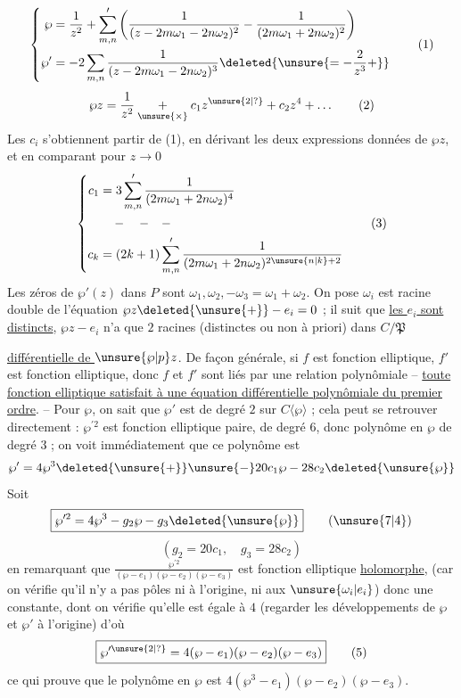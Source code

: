 \noindent {} 

\[
\left\{\begin{aligned}
\wp&=\frac1{z^2}+\sum_{m,n}'\left(\frac1{(z-2m\omega_1-2n\omega_2)^2}-\frac1{(2m\omega_1+2n\omega_2)^2}\right)\\
\wp'&=-2\sum_{m,n}\frac1{(z-2m\omega_1-2n\omega_2)^3}\deleted{\unsure{=-\frac2{z^3}+}}
\end{aligned}\right.\tag*{(1)}
\]
\[
\wp z=\frac1{z^2}\underset{\unsure{\times}}{+}c_1z^{\unsure{2|?}}+c_2z^4+\ldots\tag*{(2)}
\]
Les $c_i$ s'obtiennent  partir de (1), en dérivant les deux expressions données de $\wp z$, et en comparant pour $z\to0$
\[
\left\{\begin{aligned}
c_1&=3\sum_{m,n}'\frac1{(2m\omega_1+2n\omega_2)^4}\\
&\quad -\quad -\quad -\\
c_k&=(2k+1)\sum_{m,n}'\frac1{(2m\omega_1+2n\omega_2)^{2\unsure{n|k}+2}}
\end{aligned}\right.\tag*{(3)}
\]
Les zéros de $\wp'(z)$ dans $P$ sont $\omega_1,\omega_2,-\omega_3=\omega_1+\omega_2$. On pose  $\omega_i$ est racine double de l'équation $\wp z\deleted{\unsure{+}}-e_i=0$ ; il suit que \uline{les $e_i$ sont distincts},  $\wp z-e_i$ n'a que $2$ racines (distinctes ou non à priori) dans $C/\mathfrak P$

\uline{ différentielle de $\unsure{\wp|p}z$}. De façon générale, si $f$ est fonction elliptique, $f'$ est fonction elliptique, donc $f$ et $f'$ sont liés par une relation polynômiale -- \uline{toute fonction elliptique satisfait à une équation différentielle polynômiale du premier ordre}. -- Pour $\wp$, on sait que $\wp'$ est de degré $2$ sur $C\langle\wp\rangle$ ; cela peut se retrouver directement : $\wp^{\prime 2}$ est fonction elliptique paire, de degré $6$, donc polynôme en $\wp$ de degré $3$ ; on voit immédiatement   que ce polynôme est 
\[
\wp'=4\wp^3\deleted{\unsure{+}}\unsure{-}20c_1\wp-28c_2\deleted{\unsure{\wp}}
\]
Soit
\[
\boxed{\wp^{\prime 2}=4\wp^3-g_2\wp-g_3\deleted{\unsure{\wp}}}\tag*{(\unsure{7|4})}
\]
\[
(g_2=20c_1,\quad g_3=28c_2)
\]
 en remarquant que $\frac{\wp^{\prime 2}}{(\wp-e_1)(\wp-e_2)(\wp-e_3)}$ est fonction elliptique \uline{holomorphe}, (car on vérifie qu'il n'y a pas  pôles ni à l'origine, ni aux $\unsure{\omega_i|e_i}$) donc une constante, dont on vérifie qu'elle est égale à $4$ (regarder les développements de $\wp$ et $\wp'$ à l'origine) d'où
\[
\boxed{\wp^{\prime \unsure{2|?}}=4(\wp-e_1)(\wp-e_2)(\wp-e_3)}\tag*{(5)}
\]
ce qui prouve que le polynôme en $\wp$  est $4(\wp^3-e_1)(\wp-e_2)(\wp-e_3)$. 

